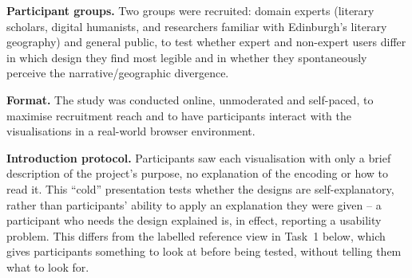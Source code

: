 \documentclass[logo,msc]{infthesis}
\begin{document}
\textbf{Participant groups.} Two groups were recruited: domain experts (literary scholars, digital humanists, and researchers familiar with Edinburgh's literary geography) and general public, to test whether expert and non-expert users differ in which design they find most legible and in whether they spontaneously perceive the narrative/geographic divergence.

\textbf{Format.} The study was conducted online, unmoderated and self-paced, to maximise recruitment reach and to have participants interact with the visualisations in a real-world browser environment.

\textbf{Introduction protocol.} Participants saw each visualisation with only a brief description of the project's purpose, no explanation of the encoding or how to read it. This ``cold'' presentation tests whether the designs are self-explanatory, rather than participants' ability to apply an explanation they were given -- a participant who needs the design explained is, in effect, reporting a usability problem. This differs from the labelled reference view in Task~1 below, which gives participants something to look at before being tested, without telling them what to look for.
 
\end{document}
